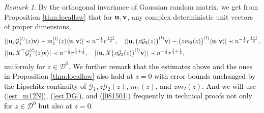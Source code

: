 \documentclass[12pt]{article}
\numberwithin{equation}{section}
\theoremstyle{remark}
\newtheorem{myRem}{Remark}
\newcommand{\1}{{\rm 1}\kern-0.24em{\rm I}}
\begin{document}
\begin{myRem} \label{rmk:locallaw}
By the orthogonal invariance of Gaussian random matrix,  we get from Proposition \ref{thm:locallaw} that  for ${\bf u},{\bf v}$, any complex deterministic unit vectors of proper dimensions, 
\begin{align}
&|\langle {\bf u},\mathcal{G}_1^{(l)}(z){\bf v}\rangle-m_1^{(l)}(z)\langle {\bf u}, {\bf v}\rangle|\prec  n^{-\frac 12}r^{\frac{1+l}{2}}, \quad   |\langle {\bf u},\big(z\mathcal{G}_2(z)\big)^{(l)}{\bf v}\rangle-\big(zm_2(z)\big)^{(l)}\langle {\bf u}, {\bf v}\rangle|\prec n^{-\frac 12}r^{\frac{1+l}{2}}, \label{est.DG}
\\
&|\langle {\bf u},{X}^{\top}\mathcal{G}_1^{(l)}(z){\bf v}\rangle|\prec  n^{-\frac12}r^{\frac 14+ \frac l 2}, \quad  |\langle  {\bf u},{X}\big(z\mathcal{G}_2(z) \big)^{(l)}{\bf v}\rangle|\prec n^{-\frac12}r^{\frac 14+ \frac l 2}, \label{081501}
\end{align}
uniformly for $z\in \mathcal{D}^0$.
\textcolor{black}{We further remark that the estimates above and the ones in Proposition \ref{thm:locallaw} also hold at $z=0$ with error bounds unchanged by the Lipschitz continuity  of $\mathcal{G}_{1}, z\mathcal{G}_2(z)$, $m_1(z)$, and $zm_2(z)$.
And we will use (\ref{est_m12N}),  (\ref{est.DG}), and (\ref{081501}) frequently in technical proofs not only for $z\in \mathcal{D}^0$ but also at $z=0$.}

\end{myRem}
\end{document}
